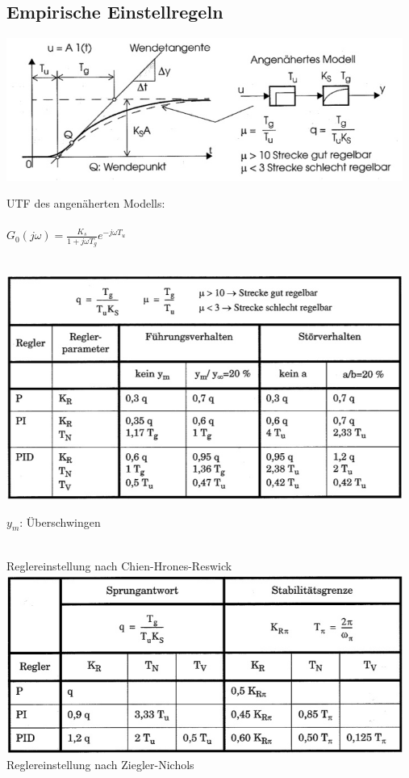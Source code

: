 	\subsection{Empirische Einstellregeln }
		\includegraphics[width=13cm]{./bilder/Empirisch_Regeln.jpg}
		\begin{minipage}[b]{5cm}
        UTF des angenäherten Modells:\\ \\
		$G_0(j\omega)=\frac{K_s}{1+j\omega T_g}e^{-j\omega T_u}$
		\vspace{2.7cm}
		\end{minipage}\\
		\includegraphics[width=13cm]{./bilder/CHR_Einst.jpg}
		\begin{minipage}[b]{5cm}
        $y_m$: \"Uberschwingen
        \vspace{4cm}
        \end{minipage}\\
		Reglereinstellung nach Chien-Hrones-Reswick\\
		\includegraphics[width=13cm]{./bilder/ZN_Einst.jpg}\\
		Reglereinstellung nach Ziegler-Nichols
		
